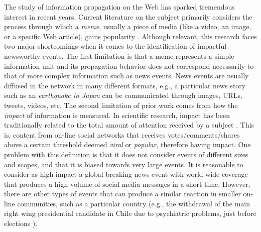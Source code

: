 
The study of information propagation on the Web has sparked tremendous
interest in recent years. Current literature on the subject primarily
considers the process through which a {\em meme}, usually a piece of
media (like a video, an image, or a specific Web article), gains
popularity
\cite{Castillo:2014,Szabo:2010,Lerman:2010,Tatar2014,Pinto:2013,Ahmed:2013,Li:2016:concept:drift,
Liu:2015:UN}.  
Although relevant, this research faces two major
shortcomings when it comes to the identification of impactful
newsworthy events.  The first limitation is that a meme represents a
simple information unit and its propagation behavior does not
correspond necessarily to that of more complex information such as
news events. News events are usually diffused in the network in many
different formats, e.g., a particular news story such as an {\em
  earthquake in Japan} can be communicated through images, URLs,
tweets, videos, etc. The second limitation of prior work comes from
how the {\em impact} of information is measured. In scientific
research, impact has been traditionally related to the total amount of
attention received by a subject
\cite{berger2012makes,iribarren2011branching,guerini2011exploring,mills2012virality,gaugaz2012predicting}.
This is, content from on-line social networks that receives
votes/comments/shares above a certain threshold deemed {\em viral} or
{\em popular}, therefore having impact. One problem with this
definition is that it does not consider events of different sizes and
scopes, and that it is biased towards very large events. It is
reasonable to consider as high-impact a global breaking news event
with world-wide coverage that produces a high volume of social media
messages in a short time.  However, there are other types of events
that can produce a similar reaction in smaller on-line communities,
such as a particular country
(e.g., the
withdrawal of the main right wing presidential candidate in Chile due
to psychiatric problems, just before
elections \cite{chile_elections}).
